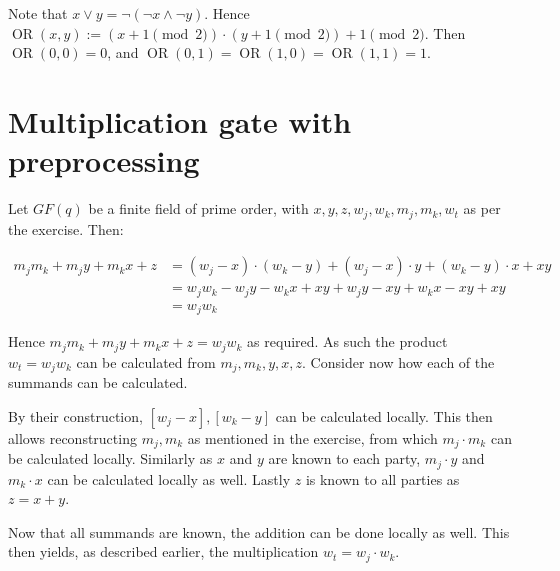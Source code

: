 \documentclass[a4paper]{scrreprt}
\begin{document}
Note that $x \lor y = \neg(\neg x \land \neg y)$. Hence $\operatorname{OR}(x,
y) := (x + 1 \pmod{2}) \cdot (y + 1 \pmod{2}) + 1 \pmod{2}$. Then
$\operatorname{OR}(0, 0) = 0$, and $\operatorname{OR}(0, 1) =
\operatorname{OR}(1, 0) = \operatorname{OR}(1, 1) = 1$.

\section{Multiplication gate with preprocessing}

Let $GF(q)$ be a finite field of prime order, with $x, y, z, w_j, w_k, m_j,
m_k, w_t$ as per the exercise. Then:

\begin{align*}
		m_j m_k + m_j y + m_k x + z & = (w_j - x) \cdot (w_k - y) + (w_j - x) \cdot y + (w_k - y) \cdot x + xy \\
									& = w_j w_k - w_j y - w_k x + xy + w_j y - xy + w_k x - xy + xy \\
									& = w_j w_k
\end{align*}

Hence $m_j m_k + m_j y + m_k x + z = w_j w_k$ as required. As such the product
$w_t = w_j w_k$ can be calculated from $m_j, m_k, y, x, z$. Consider now how
each of the summands can be calculated.

By their construction, $[w_j - x], [w_k - y]$ can be calculated locally. This
then allows reconstructing $m_j, m_k$ as mentioned in the exercise, from which
$m_j \cdot m_k$ can be calculated locally. Similarly as $x$ and $y$ are known
to each party, $m_j \cdot y$ and $m_k \cdot x$ can be calculated locally as
well. Lastly $z$ is known to all parties as $z = x + y$.

Now that all summands are known, the addition can be done locally as well. This
then yields, as described earlier, the multiplication $w_t = w_j \cdot w_k$.
\end{document}
